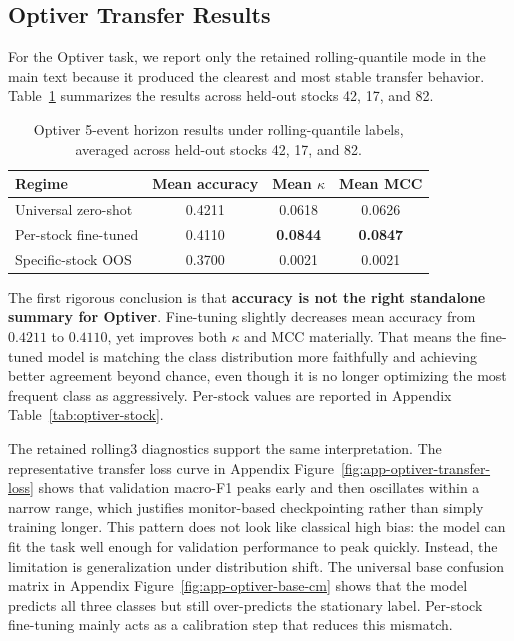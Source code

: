\documentclass[11pt]{article}
\begin{document}
\subsection{Optiver Transfer Results}
For the Optiver task, we report only the retained rolling-quantile mode in the main text because it produced the clearest and most stable transfer behavior. Table~\ref{tab:optiver-main} summarizes the results across held-out stocks 42, 17, and 82.

\begin{table}[H]
\centering
\caption{Optiver 5-event horizon results under rolling-quantile labels, averaged across held-out stocks 42, 17, and 82.}
\label{tab:optiver-main}
\begin{tabular}{lccc}
\toprule
Regime & Mean accuracy & Mean $\kappa$ & Mean MCC \\
\midrule
Universal zero-shot & 0.4211 & 0.0618 & 0.0626 \\
Per-stock fine-tuned & 0.4110 & \textbf{0.0844} & \textbf{0.0847} \\
Specific-stock OOS & 0.3700 & 0.0021 & 0.0021 \\
\bottomrule
\end{tabular}
\end{table}

The first rigorous conclusion is that \textbf{accuracy is not the right standalone summary for Optiver}. Fine-tuning slightly decreases mean accuracy from $0.4211$ to $0.4110$, yet improves both $\kappa$ and MCC materially. That means the fine-tuned model is matching the class distribution more faithfully and achieving better agreement beyond chance, even though it is no longer optimizing the most frequent class as aggressively. Per-stock values are reported in Appendix Table~\ref{tab:optiver-stock}.

The retained rolling3 diagnostics support the same interpretation. The representative transfer loss curve in Appendix Figure~\ref{fig:app-optiver-transfer-loss} shows that validation macro-F1 peaks early and then oscillates within a narrow range, which justifies monitor-based checkpointing rather than simply training longer. This pattern does not look like classical high bias: the model can fit the task well enough for validation performance to peak quickly. Instead, the limitation is generalization under distribution shift. The universal base confusion matrix in Appendix Figure~\ref{fig:app-optiver-base-cm} shows that the model predicts all three classes but still over-predicts the stationary label. Per-stock fine-tuning mainly acts as a calibration step that reduces this mismatch.
\end{document}
